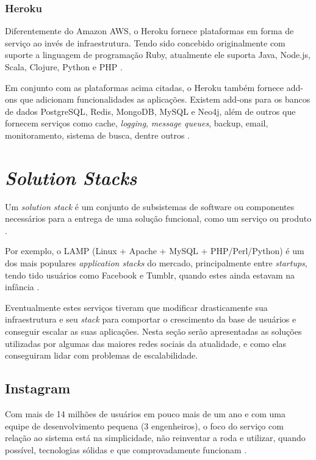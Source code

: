 \documentclass[diss]{template/setrem}
\begin{document}
\subsubsection{Heroku}
Diferentemente do Amazon AWS, o Heroku fornece plataformas em forma de serviço ao invés de infraestrutura. Tendo sido concebido originalmente com suporte a linguagem de programação Ruby, atualmente ele suporta Java, Node.js, Scala, Clojure, Python e PHP \citep{Heroku2012}.

Em conjunto com as plataformas acima citadas, o Heroku também fornece add-ons que adicionam funcionalidades as aplicações. Existem add-ons para os bancos de dados PostgreSQL, Redis, MongoDB, MySQL e Neo4j, além de outros que fornecem serviços como cache, \emph{logging}, \emph{message queues}, backup, email, monitoramento, sistema de busca, dentre outros \citep{Heroku2012}.

\section{\textit{Solution Stacks}}
Um \emph{solution stack} é um conjunto de subsistemas de software ou componentes necessários para a entrega de uma solução funcional, como um serviço ou produto \citep{Gelger2008}.

Por exemplo, o LAMP (Linux + Apache + MySQL + PHP/Perl/Python) é um dos mais populares \emph{application stacks} do mercado, principalmente entre \emph{startups}, tendo tido usuários como Facebook e Tumblr, quando estes ainda estavam na infância \citep{Canonical2010}.

Eventualmente estes serviços tiveram que modificar drasticamente sua infraestrutura e seu \emph{stack} para comportar o crescimento da base de usuários e conseguir escalar as suas aplicações. Nesta seção serão apresentadas as soluções utilizadas por algumas das maiores redes sociais da atualidade, e como elas conseguiram lidar com problemas de escalabilidade.

\subsection{Instagram}
\label{subsec:stackinstagram}
Com mais de 14 milhões de usuários em pouco mais de um ano e com uma equipe de desenvolvimento pequena (3 engenheiros), o foco do serviço com relação ao sistema está na simplicidade, não reinventar a roda e utilizar, quando possível, tecnologias sólidas e que comprovadamente funcionam \citep{Instagram2011}.
\end{document}
